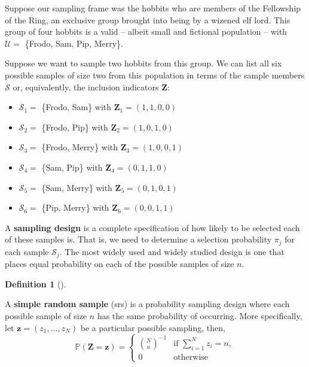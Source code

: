 \documentclass[
  letterpaper,
  DIV=11,
  numbers=noendperiod]{scrreprt}
\providecommand{\tightlist}{%
  \setlength{\itemsep}{0pt}\setlength{\parskip}{0pt}}\usepackage{longtable,booktabs,array}
\newcommand{\mb}{\symbf}
\renewcommand{\P}{\mathbb{P}}
\theoremstyle{definition}
\theoremstyle{definition}
\newtheorem{definition}{Definition}[chapter]
\theoremstyle{plain}
\theoremstyle{remark}
\begin{document}
Suppose our sampling frame was the hobbits who are members of the
Fellowship of the Ring, an exclusive group brought into being by a
wizened elf lord. This group of four hobbits is a valid -- albeit small
and fictional population -- with \(\mathcal{U} =\) \{Frodo, Sam, Pip,
Merry\}.

Suppose we want to sample two hobbits from this group. We can list all
six possible samples of size two from this population in terms of the
sample members \(\mathcal{S}\) or, equivalently, the inclusion
indicators \(\mb{Z}\):

\begin{itemize}
\tightlist
\item
  \(\mathcal{S}_1 =\) \{Frodo, Sam\} with \(\mb{Z}_{1} = (1, 1, 0, 0)\)
\item
  \(\mathcal{S}_2 =\) \{Frodo, Pip\} with \(\mb{Z}_{2} = (1, 0, 1, 0)\)
\item
  \(\mathcal{S}_3 =\) \{Frodo, Merry\} with
  \(\mb{Z}_{3} = (1, 0, 0, 1)\)
\item
  \(\mathcal{S}_4 =\) \{Sam, Pip\} with \(\mb{Z}_{4} = (0, 1, 1, 0)\)
\item
  \(\mathcal{S}_5 =\) \{Sam, Merry\} with \(\mb{Z}_{5} = (0, 1, 0, 1)\)
\item
  \(\mathcal{S}_6 =\) \{Pip, Merry\} with \(\mb{Z}_{6} = (0, 0, 1, 1)\)
\end{itemize}

A \textbf{sampling design} is a complete specification of how likely to
be selected each of these samples is. That is, we need to determine a
selection probability \(\pi_j\) for each sample \(\mathcal{S}_j\). The
most widely used and widely studied design is one that places equal
probability on each of the possible samples of size \(n\).

\begin{definition}[]\protect\hypertarget{def-srs}{}\label{def-srs}

A \textbf{simple random sample} (srs) is a probability sampling design
where each possible sample of size \(n\) has the same probability of
occurring. More specifically, let \(\mb{z} = (z_{1}, \ldots, z_{N})\) be
a particular possible sampling, then, \[
\P(\mb{Z} = \mb{z}) = \begin{cases}
{N \choose n}^{-1} &\text{if } \sum_{i=1}^N z_i = n,\\
0 & \text{otherwise}
\end{cases}
\]

\end{definition}
\end{document}
